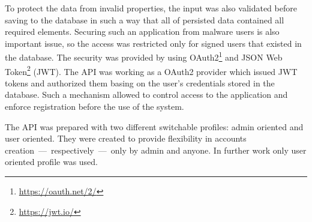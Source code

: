 To protect the data from invalid properties, the input was also validated before saving to the database in such a way that all of persisted data contained all required elements.
Securing such an application from malware users is also important issue, so the access was restricted only for signed users that existed in the database.
The security was provided by using OAuth2\footnote{\url{https://oauth.net/2/}} and JSON Web Token\footnote{\url{https://jwt.io/}} (JWT).
The API was working as a OAuth2 provider which issued JWT tokens and authorized them basing on the user's credentials stored in the database.
Such a mechanism allowed to control access to the application and enforce registration before the use of the system.

The API was prepared with two different switchable profiles: admin oriented and user oriented.
They were created to provide flexibility in accounts creation~---~respectively~---~only by admin and anyone.
In further work only user oriented profile was used.